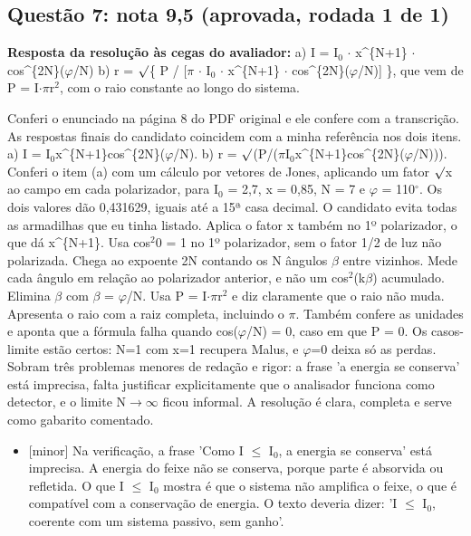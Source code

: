 \documentclass{article}%
\begin{document}
\subsection*{Questão 7: nota 9,5 (aprovada, rodada 1 de 1)}%
\textbf{Resposta da resolução às cegas do avaliador:} a) I = I$_{0}$ $\cdot$ x\^{}\{N+1\} $\cdot$ cos\^{}\{2N\}($\varphi$/N)\newline%
\newline%
b) r = $\surd$\{ P / {[}$\pi$ $\cdot$ I$_{0}$ $\cdot$ x\^{}\{N+1\} $\cdot$ cos\^{}\{2N\}($\varphi$/N){]} \}, que vem de P = I$\cdot$$\pi$r$^2$, com o raio constante ao longo do sistema.\par %
Conferi o enunciado na página 8 do PDF original e ele confere com a transcrição. As respostas finais do candidato coincidem com a minha referência nos dois itens. a) I = I$_{0}$x\^{}\{N+1\}cos\^{}\{2N\}($\varphi$/N). b) r = $\surd$(P/($\pi$I$_{0}$x\^{}\{N+1\}cos\^{}\{2N\}($\varphi$/N))). Conferi o item (a) com um cálculo por vetores de Jones, aplicando um fator $\surd$x ao campo em cada polarizador, para I$_{0}$ = 2,7, x = 0,85, N = 7 e $\varphi$ = 110$^\circ$. Os dois valores dão 0,431629, iguais até a 15ª casa decimal. O candidato evita todas as armadilhas que eu tinha listado. Aplica o fator x também no 1º polarizador, o que dá x\^{}\{N+1\}. Usa cos$^2$0 = 1 no 1º polarizador, sem o fator 1/2 de luz não polarizada. Chega ao expoente 2N contando os N ângulos $\beta$ entre vizinhos. Mede cada ângulo em relação ao polarizador anterior, e não um cos$^2$(k$\beta$) acumulado. Elimina $\beta$ com $\beta$ = $\varphi$/N. Usa P = I$\cdot$$\pi$r$^2$ e diz claramente que o raio não muda. Apresenta o raio com a raiz completa, incluindo o $\pi$. Também confere as unidades e aponta que a fórmula falha quando cos($\varphi$/N) = 0, caso em que P = 0. Os casos{-}limite estão certos: N=1 com x=1 recupera Malus, e $\varphi$=0 deixa só as perdas. Sobram três problemas menores de redação e rigor: a frase 'a energia se conserva' está imprecisa, falta justificar explicitamente que o analisador funciona como detector, e o limite N$\to$$\infty$ ficou informal. A resolução é clara, completa e serve como gabarito comentado.%
\begin{itemize}%
\item%
{[}minor{]} Na verificação, a frase 'Como I $\leq$ I$_{0}$, a energia se conserva' está imprecisa. A energia do feixe não se conserva, porque parte é absorvida ou refletida. O que I $\leq$ I$_{0}$ mostra é que o sistema não amplifica o feixe, o que é compatível com a conservação de energia. O texto deveria dizer: 'I $\leq$ I$_{0}$, coerente com um sistema passivo, sem ganho'.%

\end{itemize}$$
\end{document}
